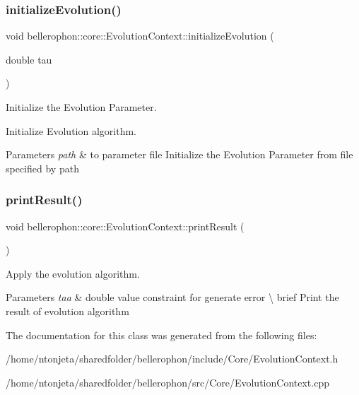 \subsubsection{\texorpdfstring{initialize\+Evolution()}{initializeEvolution()}}
{\footnotesize\ttfamily void bellerophon\+::core\+::\+Evolution\+Context\+::initialize\+Evolution (\begin{DoxyParamCaption}\item[{double}]{tau }\end{DoxyParamCaption})}



Initialize the Evolution Parameter. 

Initialize Evolution algorithm.


\begin{DoxyParams}{Parameters}
{\em path} & to parameter file  Initialize the Evolution Parameter from file specified by path \\
\hline
\end{DoxyParams}
\hypertarget{classbellerophon_1_1core_1_1EvolutionContext_aa100267fe3f388b794dfeb6d1c105c89}{}\label{classbellerophon_1_1core_1_1EvolutionContext_aa100267fe3f388b794dfeb6d1c105c89} 
\subsubsection{\texorpdfstring{print\+Result()}{printResult()}}
{\footnotesize\ttfamily void bellerophon\+::core\+::\+Evolution\+Context\+::print\+Result (\begin{DoxyParamCaption}{ }\end{DoxyParamCaption})}



Apply the evolution algorithm. 


\begin{DoxyParams}{Parameters}
{\em taa} & double value constraint for generate error \textbackslash{} brief Print the result of evolution algorithm \\
\hline
\end{DoxyParams}


The documentation for this class was generated from the following files\+:\begin{DoxyCompactItemize}
\item 
/home/ntonjeta/sharedfolder/bellerophon/include/\+Core/Evolution\+Context.\+h\item 
/home/ntonjeta/sharedfolder/bellerophon/src/\+Core/Evolution\+Context.\+cpp\end{DoxyCompactItemize}
